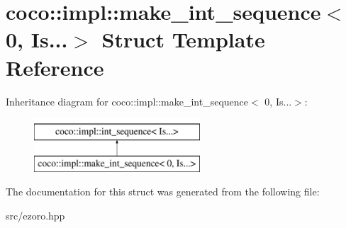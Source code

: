 \hypertarget{structcoco_1_1impl_1_1make__int__sequence_3_010_00_01_is_8_8_8_4}{\section{coco\-:\-:impl\-:\-:make\-\_\-int\-\_\-sequence$<$ 0, Is...$>$ Struct Template Reference}
\label{structcoco_1_1impl_1_1make__int__sequence_3_010_00_01_is_8_8_8_4}
}
Inheritance diagram for coco\-:\-:impl\-:\-:make\-\_\-int\-\_\-sequence$<$ 0, Is...$>$\-:\begin{figure}[H]
\begin{center}
\leavevmode
\includegraphics[height=2.000000cm]{structcoco_1_1impl_1_1make__int__sequence_3_010_00_01_is_8_8_8_4}
\end{center}
\end{figure}


The documentation for this struct was generated from the following file\-:\begin{DoxyCompactItemize}
\item 
src/ezoro.\-hpp\end{DoxyCompactItemize}
